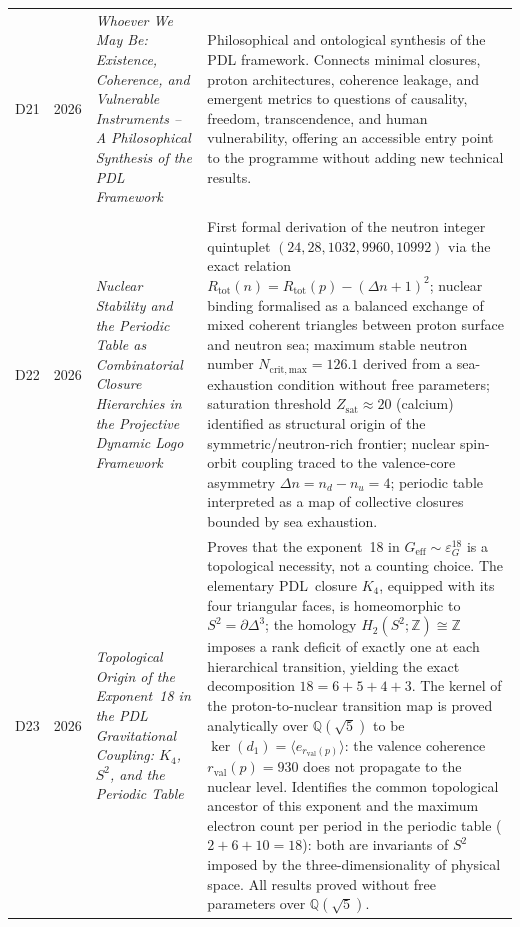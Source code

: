 \documentclass[11pt,a4paper]{article}
\newcommand{\PDL}{\textnormal{PDL}}
\begin{document}
\begin{longtable}{@{}llL{4cm}p{9.0cm}@{}}
D21 & 2026 & \textit{Whoever We May Be: Existence, Coherence, and Vulnerable Instruments -- A Philosophical Synthesis of the PDL Framework} &
Philosophical and ontological synthesis of the PDL framework. Connects minimal closures, proton architectures, coherence leakage, and emergent metrics to questions of causality, freedom, transcendence, and human vulnerability, offering an accessible entry point to the programme without adding new technical results.\citep{WhoeverWeMayBe2026} \\\\[0.5em]

D22 & 2026 & \textit{Nuclear Stability and the Periodic Table as Combinatorial Closure Hierarchies in the Projective Dynamic Logo
Framework} &
First formal derivation of the neutron integer quintuplet $(24,28,1032,9960,10992)$ via the exact relation $R_{\mathrm{tot}}(n) = R_{\mathrm{tot}}(p) - (\Delta n+1)^2$; nuclear binding formalised as a balanced exchange of mixed coherent triangles between proton surface and neutron sea; maximum stable neutron number $N_{\mathrm{crit,max}} = 126.1$ derived from a sea-exhaustion condition without free parameters; saturation threshold $Z_{\mathrm{sat}} \approx 20$ (calcium) identified as structural origin of the symmetric/neutron-rich frontier; nuclear spin-orbit coupling traced to the valence-core asymmetry $\Delta n = n_d - n_u = 4$; periodic table interpreted as a map of collective closures bounded by sea exhaustion.
\citep{Nuclear_Stability_PDL_2026} \\[0.4em]

D23 & 2026 & \textit{Topological Origin of the Exponent~18 in the PDL Gravitational Coupling: $K_4$, $S^2$, and the Periodic Table} &
Proves that the exponent~18 in $G_{\mathrm{eff}} \sim \varepsilon_G^{18}$ is a topological necessity, not a counting choice. The elementary \PDL\ closure $K_4$, equipped with its four triangular faces, is homeomorphic to $S^2 = \partial\Delta^3$; the homology $H_2(S^2;\mathbb{Z}) \cong \mathbb{Z}$ imposes a rank deficit of exactly one at each hierarchical transition, yielding the exact decomposition $18 = 6+5+4+3$. The kernel of the proton-to-nuclear transition map is proved analytically over $\mathbb{Q}(\sqrt{5})$ to be $\ker(d_1) = \langle e_{r_{\mathrm{val}}(p)}\rangle$: the valence coherence $r_{\mathrm{val}}(p) = 930$ does not propagate to the nuclear level. Identifies the common topological ancestor of this exponent and the maximum electron count per period in the periodic table ($2+6+10 = 18$): both are invariants of $S^2$ imposed by the three-dimensionality of physical space. All results proved without free parameters over $\mathbb{Q}(\sqrt{5})$. \citep{Topology_18_PDL_2026} \\[0.4em]

\bottomrule
\end{longtable}
\end{document}
